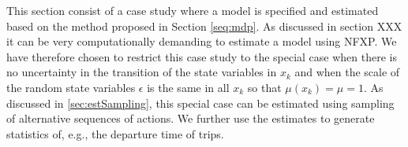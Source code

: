 \newcommand{\cost}{\text{cost}}
\newcommand{\car}{\text{car}}
\newcommand{\pt}{\text{PT}}
\newcommand{\walk}{\text{walk}}
\newcommand{\bike}{\text{bike}}
\newcommand{\hi}{\text{h.i}}
\newcommand{\wait}{\text{wait}}
\newcommand{\geqfive}{\text{s.z.,walk}}
\newcommand{\mc}{\theta}
\newcommand{\ac}{C}
\newcommand{\acp}{\theta}
\newcommand{\dura}[1]{\Delta t_#1}
\newcommand{\TT}{TT}
\newcommand{\ustay}{\avgu_\text{stay}}
\newcommand{\stay}{\text{stay}}

\newcommand{\p}[1]{p_{\text{#1}}}
\newcommand{\m}[1]{m_{\text{#1}}}
\newcommand{\amemm}[1]{\amem_\text{#1}}
\newcommand{\dummy}[1]{\delta_{#1}}

This section consist of a case study where a model is specified and estimated based on the method proposed in Section \ref{seq:mdp}.
As discussed in section XXX %
it can be very computationally demanding to estimate a model using NFXP. We have therefore chosen to restrict this case study to the special case when there is no uncertainty in the transition of the state variables in $x_k$ and when the scale of the random state variables $\epsilon$ is the same in all $x_k$ so that $\mu(x_k)=\mu=1$. As discussed in \ref{sec:estSampling}, this special case can be estimated using sampling of alternative sequences of actions. We further use the estimates to generate statistics of, e.g., the departure time of trips. 


